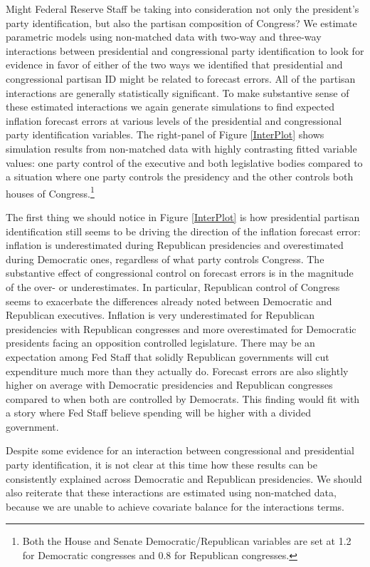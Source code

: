 \documentclass[a4paper]{article}\usepackage{graphicx, color}
\begin{document}
Might Federal Reserve Staff be taking into consideration not only the president's party identification, but also the partisan composition of Congress?  We estimate parametric models using non-matched data with two-way and three-way interactions between presidential and congressional party identification to look for evidence in favor of either of the two ways we identified that presidential and congressional partisan ID might be related to forecast errors. All of the partisan interactions are generally statistically significant. To make substantive sense of these estimated interactions we again generate simulations to find expected inflation forecast errors at various levels of the presidential and congressional party identification variables. The right-panel of Figure \ref{InterPlot} shows simulation results from non-matched data with highly contrasting fitted variable values: one party control of the executive and both legislative bodies compared to a situation where one party controls the presidency and the other controls both houses of Congress.\footnote{Both the House and Senate Democratic/Republican variables are set at 1.2 for Democratic congresses and 0.8 for Republican congresses.} 

The first thing we should notice in Figure \ref{InterPlot} is how presidential partisan identification still seems to be driving the direction of the inflation forecast error: inflation is underestimated during Republican presidencies and overestimated during Democratic ones, regardless of what party controls Congress. The substantive effect of congressional control on forecast errors is in the magnitude of the over- or underestimates. In particular, Republican control of Congress seems to exacerbate the differences already noted between Democratic and Republican executives. Inflation is very underestimated for Republican presidencies with Republican congresses and more overestimated for Democratic presidents facing an opposition controlled legislature. There may be an expectation among Fed Staff that solidly Republican governments will cut expenditure much more than they actually do. Forecast errors are also slightly higher on average with Democratic presidencies and Republican congresses compared to when both are controlled by Democrats. This finding would fit with a story where Fed Staff believe spending will be higher with a divided government. 

Despite some evidence for an interaction between congressional and presidential party identification, it is not clear at this time how these results can be consistently explained across Democratic and Republican presidencies. We should also reiterate that these interactions are estimated using non-matched data, because we are unable to achieve covariate balance for the interactions terms.
\end{document}

